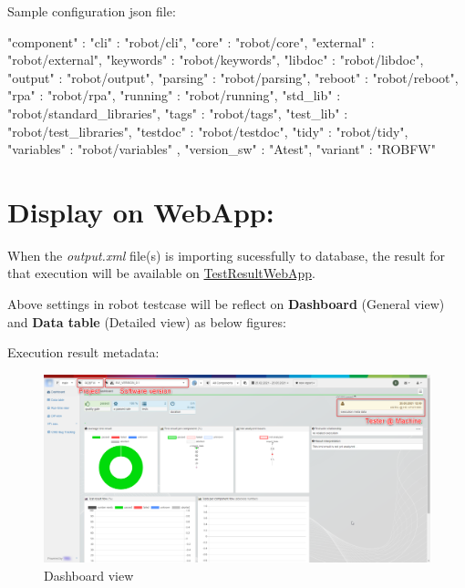 \begin{itemize}
  Sample configuration json file:

\begin{pythoncode}
{
   "component"  : {
                  "cli"       : "robot/cli",
                  "core"      : "robot/core",
                  "external"  : "robot/external",
                  "keywords"  : "robot/keywords",
                  "libdoc"    : "robot/libdoc",
                  "output"    : "robot/output",
                  "parsing"   : "robot/parsing",
                  "reboot"    : "robot/reboot",
                  "rpa"       : "robot/rpa",
                  "running"   : "robot/running",
                  "std_lib"   : "robot/standard_libraries",
                  "tags"      : "robot/tags",
                  "test_lib"  : "robot/test_libraries",
                  "testdoc"   : "robot/testdoc",
                  "tidy"      : "robot/tidy",
                  "variables" : "robot/variables"
   },
   "version_sw" : "Atest",
   "variant"    : "ROBFW"
}
\end{pythoncode}
\end{itemize}


\newpage
\hypertarget{description-display-on-webapp}{%
\section{Display on WebApp:}\label{description-display-on-webapp}}

When the \emph{output.xml} file(s) is importing sucessfully to database,
the result for that execution will be available on
\href{https://github.com/test-fullautomation/testresultwebapp}{TestResultWebApp}.

Above settings in robot testcase will be reflect on \textbf{Dashboard}
(General view) and \textbf{Data table} (Detailed view) as below figures:

Execution result metadata:

\begin{figure}[h!]
  \includegraphics[width=1\linewidth]{./pictures/Dashboard.png}
  \caption{Dashboard view}
\end{figure}

